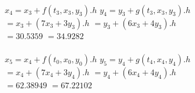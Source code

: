 \documentclass[a4paper]{article}
\begin{document}
\begin{flushleft}
\begin{itemize}
            \\
            $x_4=x_3+f(t_3,x_3,y_3).h$ \hspace*{3cm} $y_4=y_3+g(t_3,x_3,y_3).h$ \\
            \hspace*{.34cm} $=x_3+(7x_3 + 3y_3).h$ \hspace*{3.44cm} $=y_3+(6x_3+4y_3).h$ \\
            \hspace*{.34cm} $=30.5359$ \hspace*{5.12cm} $=34.9282$ \\
            \\
            $x_5=x_4+f(t_0,x_0,y_0).h$ \hspace*{3cm} $y_5=y_4+g(t_4,x_4,y_4).h$ \\
            \hspace*{.34cm} $=x_4+(7x_4 + 3y_4).h$ \hspace*{3.45cm} $=y_4+(6x_4+4y_4).h$ \\
            \hspace*{.34cm} $=62.38949$ \hspace*{4.96cm} $=67.22102$ \\
    \end{itemize}
    

\end{flushleft}
\end{document}
